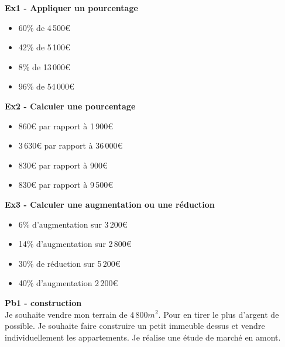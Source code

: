 \begin{multicols}{3}\noindent
  \textbf{Ex1 - Appliquer un pourcentage}\\

  \begin{itemize}[label={$\bullet$}]
    \item 60\% de 4\,500€
    \item 42\% de 5\,100€
    \item 8\% de 13\,000€
    \item 96\% de 54\,000€
  \end{itemize}

  \textbf{Ex2 - Calculer une pourcentage}\\

  \begin{itemize}[label={$\bullet$}]
    \item 860€ par rapport à 1\,900€
    \item 3\,630€ par rapport à 36\,000€
    \item 830€ par rapport à 900€
    \item 830€ par rapport à 9\,500€
  \end{itemize}

\textbf{Ex3 - Calculer une augmentation ou une réduction}\\


\begin{itemize}[label={$\bullet$}]
  \item  6\% d'augmentation sur 3\,200€
  \item 14\% d'augmentation sur 2\,800€
  \item 30\% de réduction sur 5\,200€
  \item 40\% d'augmentation 2\,200€
\end{itemize}
\end{multicols}

\textbf{Pb1 - construction}\\

Je souhaite vendre mon terrain de $4\,800m^2$. Pour en tirer le plus d'argent de possible. Je souhaite faire construire un petit immeuble dessus et vendre individuellement les appartements. Je réalise une étude de marché en amont. 

